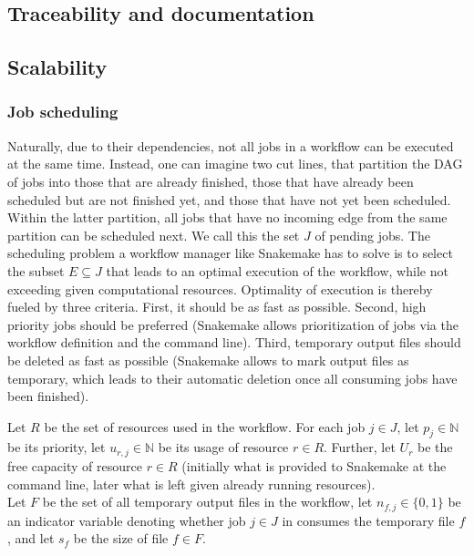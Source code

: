 \documentclass[parskip=half]{scrartcl}
\begin{document}
\subsection{Traceability and documentation}

\subsection{Scalability}

\subsubsection{Job scheduling}

Naturally, due to their dependencies, not all jobs in a workflow can be executed at the same time.
Instead, one can imagine two cut lines, that partition the DAG of jobs into those that are already finished, those that have already been scheduled but are not finished yet, and those that have not yet been scheduled.
Within the latter partition, all jobs that have no incoming edge from the same partition can be scheduled next.
We call this the set $J$ of pending jobs.
The scheduling problem a workflow manager like Snakemake has to solve is to select the subset $E \subseteq J$ that leads to an optimal execution of the workflow, while not exceeding given computational resources.
Optimality of execution is thereby fueled by three criteria.
First, it should be as fast as possible.
Second, high priority jobs should be preferred (Snakemake allows prioritization of jobs via the workflow definition and the command line).
Third, temporary output files should be deleted as fast as possible (Snakemake allows to mark output files as temporary, which leads to their automatic deletion once all consuming jobs have been finished).

\newcommand{\N}{\mathbb{N}}

Let $R$ be the set of resources used in the workflow.
For each job $j \in J$, let $p_j \in \N$ be its priority, let $u_{r,j} \in \N$ be its usage of resource $r \in R$.
Further, let $U_r$ be the free capacity of resource $r \in R$ (initially what is provided to Snakemake at the command line, later what is left given already running resources).
\\
Let $F$ be the set of all temporary output files in the workflow, let $n_{f,j} \in \{0,1\}$ be an indicator variable denoting whether job $j \in J$ in consumes the temporary file $f$, and let $s_f$ be the size of file $f \in F$.
\end{document}
